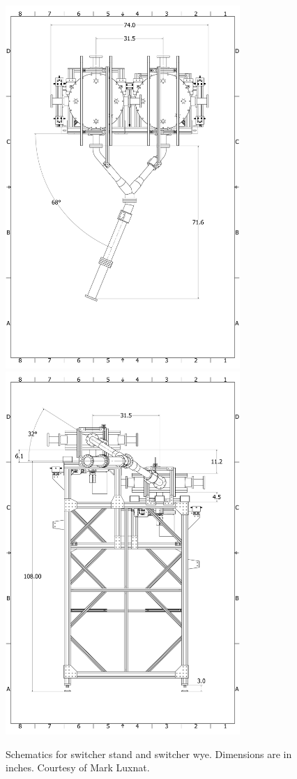 \begin{figure}
    \centering
    \includegraphics[width=3.5in]{figures/switcher_horizontals.pdf}
    \includegraphics[width=3.5in]{figures/switcher_verticals.pdf}
    \caption
    {Schematics for switcher stand and switcher wye. Dimensions are in inches. Courtesy of Mark Luxnat.}
    \label{fig:switcher_stand_measurements}
\end{figure}


